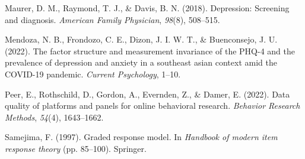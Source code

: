 \documentclass[
  man,floatsintext]{apa6}
\newlength{\cslhangindent}
\newlength{\cslentryspacingunit} %
\newenvironment{CSLReferences}[2] %
 {%
  \setlength{\parindent}{0pt}
  \ifodd #1
  \let\oldpar\par
  \def\par{\hangindent=\cslhangindent\oldpar}
  \fi
  \setlength{\parskip}{#2\cslentryspacingunit}
 }%
 {}
\begin{document}
\begin{CSLReferences}{1}{0}
\leavevmode{}%
Maurer, D. M., Raymond, T. J., \& Davis, B. N. (2018). Depression: Screening and diagnosis. \emph{American Family Physician}, \emph{98}(8), 508--515.

\leavevmode{}%
Mendoza, N. B., Frondozo, C. E., Dizon, J. I. W. T., \& Buenconsejo, J. U. (2022). The factor structure and measurement invariance of the PHQ-4 and the prevalence of depression and anxiety in a southeast asian context amid the COVID-19 pandemic. \emph{Current Psychology}, 1--10.

\leavevmode{}%
Peer, E., Rothschild, D., Gordon, A., Evernden, Z., \& Damer, E. (2022). Data quality of platforms and panels for online behavioral research. \emph{Behavior Research Methods}, \emph{54}(4), 1643--1662.

\leavevmode{}%
Samejima, F. (1997). Graded response model. In \emph{Handbook of modern item response theory} (pp. 85--100). Springer.

\end{CSLReferences}


\clearpage
\renewcommand{\listfigurename}{Figure captions}
\end{document}
